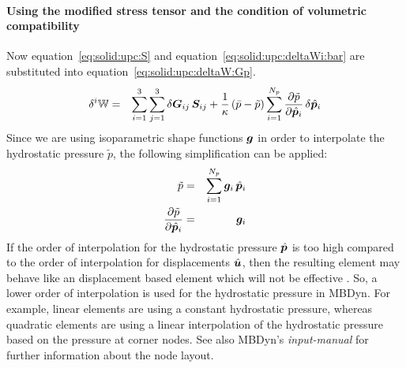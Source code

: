 \paragraph{Using the modified stress tensor and the condition of volumetric compatibility}
Now equation~\ref{eq:solid:upc:S} and equation~\ref{eq:solid:upc:deltaWi:bar} are substituted into equation~\ref{eq:solid:upc:deltaW:Gp}.
\begin{eqnarray}
\delta^i\mathbb{W} & = & \sum_{i=1}^{3}\sum_{j=1}^{3} \delta\boldsymbol{G}_{ij}\,\boldsymbol{S}_{ij} + \frac{1}{\kappa}\left(\bar{p} - \tilde{p}\right)\sum_{i=1}^{N_p}\frac{\partial \tilde{p}}{\partial \hat{\bm{p}}_i}\,\delta\hat{\bm{p}}_i \label{eq:solid:upc:deltaWi:V}
\end{eqnarray}
Since we are using isoparametric shape functions $\bm{g}$ in order to interpolate the hydrostatic pressure $\tilde{p}$, the following simplification can be applied:
\begin{eqnarray}
\tilde{p} & = & \sum_{i=1}^{N_p} \bm{g}_i \, \hat{\bm{p}}_i \\
\frac{\partial \tilde{p}}{\partial \hat{\bm{p}}_i} & = & \bm{g}_i
\end{eqnarray}
If the order of interpolation for the hydrostatic pressure $\hat{\bm{p}}$ is too high compared to the order of interpolation for displacements $\hat{\bm{u}}$,
then the resulting element may behave like an displacement based element which will not be effective \cite{BATHE2016}.
So, a lower order of interpolation is used for the hydrostatic pressure in MBDyn.
For example, linear elements are using a constant hydrostatic pressure, whereas quadratic elements
are using a linear interpolation of the hydrostatic pressure based on the pressure at corner nodes.
See also MBDyn's \emph{input-manual} for further information about the node layout.
